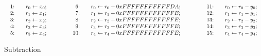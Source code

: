\begin{figure*}[ht]
  \centering
  \[
  \begin{array}{lclcl}
    \begin{array}{rcl}
    \textmd{1:} && {r}_0 \leftarrow {x}_0; \\
    \textmd{2:} && {r}_1 \leftarrow {x}_1; \\
    \textmd{3:} && {r}_2 \leftarrow {x}_2; \\
    \textmd{4:} && {r}_3 \leftarrow {x}_3; \\
    \textmd{5:} && {r}_5 \leftarrow {x}_4; \\
    \end{array}
    &\hspace{.05\textwidth}&
    \begin{array}{rcl}
    \textmd{6:} &&
      {r}_0 \leftarrow {r}_0 + {0xFFFFFFFFFFFDA}; \\
    \textmd{7:} &&
      {r}_1 \leftarrow {r}_1 + {0xFFFFFFFFFFFFE}; \\
    \textmd{8:} &&
      {r}_2 \leftarrow {r}_2 + {0xFFFFFFFFFFFFE}; \\
    \textmd{9:} &&
      {r}_3 \leftarrow {r}_3 + {0xFFFFFFFFFFFFE}; \\
    \textmd{10:} &&
      {r}_4 \leftarrow {r}_4 + {0xFFFFFFFFFFFFE};\\
    \end{array}
    &\hspace{.05\textwidth}&
    \begin{array}{rcl}
    \textmd{11:} && {r}_0 \leftarrow {r}_0 - {y}_0; \\
    \textmd{12:} && {r}_1 \leftarrow {r}_1 - {y}_1; \\
    \textmd{13:} && {r}_2 \leftarrow {r}_2 - {y}_2; \\
    \textmd{14:} && {r}_3 \leftarrow {r}_3 - {y}_3; \\
    \textmd{15:} && {r}_4 \leftarrow {r}_4 - {y}_4;
    \end{array}
  \end{array}
  \]
  \caption{Subtraction }
  \label{figure:dsl:subtraction}
\end{figure*}

